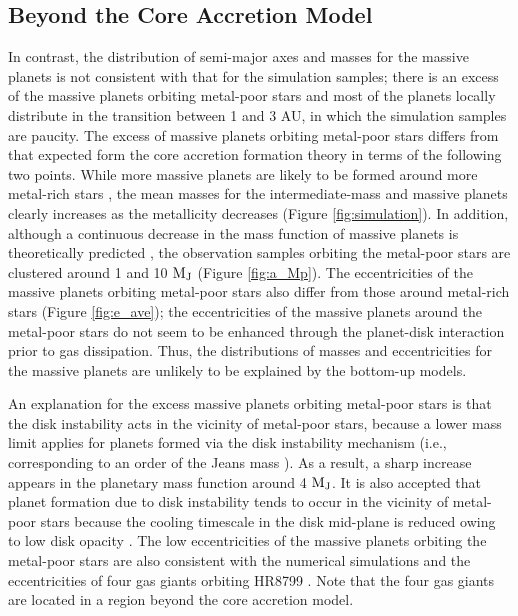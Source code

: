 \documentclass[twocolumn, dvipdfmx]{aastex62}
\begin{document}
\begin{CJK*}{UTF8}{min}
\subsection{Beyond the Core Accretion Model} \label{subsec:beyond}

In contrast, the distribution of semi-major axes and masses for the massive planets is not consistent with that for the simulation samples; there is an excess of the massive planets orbiting metal-poor stars and most of the planets locally distribute in the transition between 1 and 3 AU, in which the simulation samples are paucity. The excess of massive planets orbiting metal-poor stars differs from that expected form the core accretion formation theory in terms of the following two points. While more massive planets are likely to be formed around more metal-rich stars \citep{2012A&A...541A..97M}, the mean masses for the intermediate-mass and massive planets clearly increases as the metallicity decreases (Figure \ref{fig:simulation}). In addition, although a continuous decrease in the mass function of massive planets is theoretically predicted \citep{2009A&A...501.1161M}, the observation samples orbiting the metal-poor stars are clustered around 1 and 10 $\rm M_J$ (Figure \ref{fig:a_Mp}). The eccentricities of the massive planets orbiting metal-poor stars also differ from those around metal-rich stars (Figure \ref{fig:e_ave}); the eccentricities of the massive planets around the metal-poor stars do not seem to be enhanced through the planet-disk interaction prior to gas dissipation. Thus, the distributions of masses and eccentricities for the massive planets are unlikely to be explained by the bottom-up models.

An explanation for the excess massive planets orbiting metal-poor stars is that the disk instability acts in the vicinity of metal-poor stars, because a lower mass limit applies for planets formed via the disk instability mechanism (i.e., corresponding to an order of the Jeans mass \citep{2007ApJ...662.1282M, 2010Wiley}). As a result, a sharp increase appears in the planetary mass function around 4 $\rm M_J$. It is also accepted that planet formation due to disk instability tends to occur in the vicinity of metal-poor stars because the cooling timescale in the disk mid-plane is reduced owing to low disk opacity \citep{2006ApJ...636L.149C, 2007Arizona}. The low eccentricities of the massive planets orbiting the metal-poor stars are also consistent with the numerical simulations \citep{2004ApJ...609.1045M, 2010Wiley, 2011ApJ...731...74B} and the eccentricities of four gas giants orbiting HR8799 \citep{2017A&A...598A..83W}. Note that the four gas giants are located in a region beyond the core accretion model.



\end{CJK*}
\end{document}
